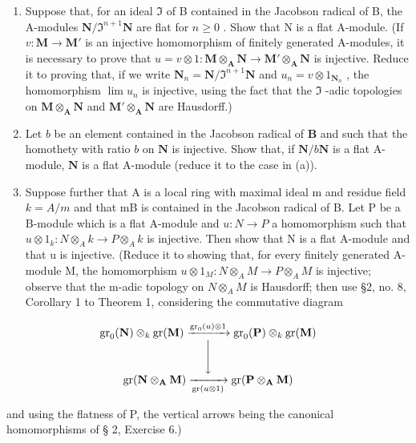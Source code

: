 \begin{enumerate}
\def\labelenumi{(\alph{enumi})}
\item
  Suppose that, for an ideal \(\mathfrak{I}\) of B contained in the Jacobson radical of B, the A-modules \(\mathbf{N} / \mathfrak{I}^{n + 1}\mathbf{N}\) are flat for \(n\geqslant 0\) . Show that N is a flat A-module. (If \(v\colon \mathbf{M}\to \mathbf{M}'\) is an injective homomorphism of finitely generated A-modules, it is necessary to prove that \(u = v\otimes 1:\mathbf{M}\otimes_{\mathbf{A}}\mathbf{N}\rightarrow \mathbf{M}'\otimes_{\mathbf{A}}\mathbf{N}\) is injective. Reduce it to proving that, if we write \(\mathbf{N}_n = \mathbf{N} / \mathfrak{I}^{n + 1}\mathbf{N}\) and \(u_{n} = v\otimes 1_{\mathbf{N}_{n}}\) , the homomorphism \(\lim u_n\) is injective, using the fact that the \(\mathfrak{I}\) -adic topologies on \(\mathbf{M}\otimes_{\mathbf{A}}\mathbf{N}\) and \(\mathbf{M}'\otimes_{\mathbf{A}}\mathbf{N}\) are Hausdorff.)
\item
  Let \(b\) be an element contained in the Jacobson radical of \(\mathbf{B}\) and such that the homothety with ratio \(b\) on \(\mathbf{N}\) is injective. Show that, if \(\mathbf{N} / b\mathbf{N}\) is a flat A-module, \(\mathbf{N}\) is a flat A-module (reduce it to the case in (a)).
\item
  Suppose further that A is a local ring with maximal ideal m and residue field \(k = A/m\) and that mB is contained in the Jacobson radical of B. Let P be a B-module which is a flat A-module and \(u: N \to P\) a homomorphism such that \(u \otimes 1_k: N \otimes_A k \to P \otimes_A k\) is injective. Then show that N is a flat A-module and that u is injective. (Reduce it to showing that, for every finitely generated A-module M, the homomorphism \(u \otimes 1_M: N \otimes_A M \to P \otimes_A M\) is injective; observe that the m-adic topology on \(N \otimes_A M\) is Hausdorff; then use §2, no. 8, Corollary 1 to Theorem 1, considering the commutative diagram
\end{enumerate}

\[
\begin{array}{c} \operatorname{gr} _ {0} (\mathbf {N}) \otimes_ {k} \operatorname{gr} (\mathbf {M}) \xrightarrow {\operatorname{gr} _ {0} (u) \otimes 1} \operatorname{gr} _ {0} (\mathbf {P}) \otimes_ {k} \operatorname{gr} (\mathbf {M}) \\ \Biggl \downarrow \\ \operatorname{gr} (\mathbf {N} \otimes_ {\mathbf {A}} \mathbf {M}) \xrightarrow [ \operatorname{gr} (u \otimes 1) ]{} \operatorname{gr} (\mathbf {P} \otimes_ {\mathbf {A}} \mathbf {M}) \end{array}
\]

and using the flatness of P, the vertical arrows being the canonical homomorphisms of § 2, Exercise 6.)

